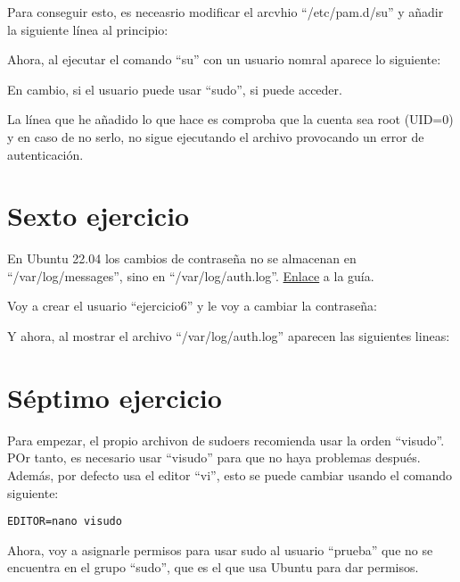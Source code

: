 \documentclass{article}
\begin{document}
Para conseguir esto, es neceasrio modificar el arcvhio ``/etc/pam.d/su'' y añadir la siguiente línea al principio:


Ahora, al ejecutar el comando ``su'' con un usuario nomral aparece lo siguiente:



En cambio, si el usuario puede usar ``sudo'', si puede acceder.


La línea que he añadido lo que hace es comproba que la cuenta sea root (UID=0) y en caso de no serlo, no sigue ejecutando el archivo provocando un error de autenticación.


\section{Sexto ejercicio}
En Ubuntu 22.04 los cambios de contraseña no se almacenan en ``/var/log/messages'', sino en ``/var/log/auth.log''. \href{https://ubuntu.com/tutorials/viewing-and-monitoring-log-files#2-log-files-locations}{Enlace} a la guía.


Voy a crear el usuario ``ejercicio6'' y le voy a cambiar la contraseña:


Y ahora, al mostrar el archivo ``/var/log/auth.log'' aparecen las siguientes lineas:


\section{Séptimo ejercicio}
Para empezar, el propio archivon de sudoers recomienda usar la orden ``visudo''. POr tanto, es necesario usar ``visudo'' para que no haya problemas después. Además, por defecto usa el editor ``vi'', esto se puede cambiar usando el comando siguiente:

\verb|EDITOR=nano visudo|

Ahora, voy a asignarle permisos para usar sudo al usuario ``prueba'' que no se encuentra en el grupo ``sudo'', que es el que usa Ubuntu para dar permisos.
\end{document}
